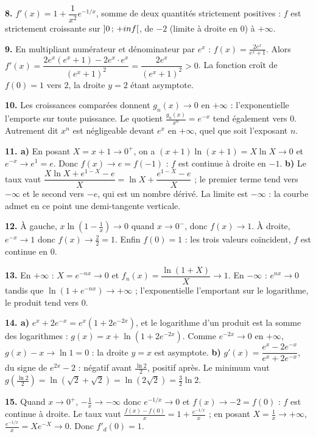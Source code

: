 \begin{corrige}[annales]
\textbf{8.} $f'(x) = 1+\dfrac{1}{x^{2}}e^{-1/x}$, somme de deux quantités
strictement positives : $f$ est strictement croissante sur
$\left]0\,;\,+inf\right[$, de $-2$ (limite à droite en $0$) à $+\infty$.

\textbf{9.} En multipliant numérateur et dénominateur par $e^{x}$ :
$f(x) = \frac{2e^{x}}{e^{x}+1}$. Alors
$f'(x) = \dfrac{2e^{x}\left(e^{x}+1\right)-2e^{x}\cdot e^{x}}{\left(e^{x}+1\right)^{2}}
= \dfrac{2e^{x}}{\left(e^{x}+1\right)^{2}}>0$. La fonction croît de
$f(0) = 1$ vers $2$, la droite $y = 2$ étant asymptote.

\textbf{10.} Les croissances comparées donnent $g_{n}(x)\to0$ en $+\infty$ :
l'exponentielle l'emporte sur toute puissance. Le quotient
$\frac{g_{n}(x)}{x^{n}} = e^{-x}$ tend également vers $0$. Autrement dit
$x^{n}$ est négligeable devant $e^{x}$ en $+\infty$, quel que soit l'exposant
$n$.

\textbf{11. a)} En posant $X = x+1 \to 0^{+}$, on a
$(x+1)\ln(x+1) = X\ln X \to 0$ et $e^{-x} \to e^{1} = e$. Donc
$f(x) \to e = f(-1)$ : $f$ est continue à droite en $-1$.
\textbf{b)} Le taux vaut
$\dfrac{X\ln X+e^{1-X}-e}{X} = \ln X+\dfrac{e^{1-X}-e}{X}$ ; le premier terme
tend vers $-\infty$ et le second vers $-e$, qui est un nombre dérivé. La
limite est $-\infty$ : la courbe admet en ce point une demi-tangente
verticale.

\textbf{12.} À gauche, $x\ln\!\left(1-\frac1x\right) \to 0$ quand
$x\to0^{-}$, donc $f(x)\to1$. À droite, $e^{-x}\to1$ donc
$f(x)\to\frac22 = 1$. Enfin $f(0) = 1$ : les trois valeurs coïncident, $f$ est
continue en $0$.

\textbf{13.} En $+\infty$ : $X = e^{-nx}\to0$ et
$f_{n}(x) = \dfrac{\ln(1+X)}{X}\to1$. En $-\infty$ : $e^{nx}\to0$ tandis que
$\ln\!\left(1+e^{-nx}\right)\to+\infty$ ; l'exponentielle l'emportant sur le
logarithme, le produit tend vers $0$.

\textbf{14. a)} $e^{x}+2e^{-x} = e^{x}\left(1+2e^{-2x}\right)$, et le
logarithme d'un produit est la somme des logarithmes :
$g(x) = x+\ln\!\left(1+2e^{-2x}\right)$. Comme $e^{-2x}\to0$ en $+\infty$,
$g(x)-x \to \ln 1 = 0$ : la droite $y = x$ est asymptote.
\textbf{b)} $g'(x) = \dfrac{e^{x}-2e^{-x}}{e^{x}+2e^{-x}}$, du signe de
$e^{2x}-2$ : négatif avant $\frac{\ln2}{2}$, positif après. Le minimum vaut
$g\!\left(\frac{\ln2}{2}\right) = \ln\!\left(\sqrt2+\sqrt2\right)
= \ln\!\left(2\sqrt2\right) = \frac32\ln2$.

\textbf{15.} Quand $x\to0^{+}$, $-\frac1x\to-\infty$ donc $e^{-1/x}\to0$ et
$f(x)\to-2 = f(0)$ : $f$ est continue à droite. Le taux vaut
$\frac{f(x)-f(0)}{x} = 1+\frac{e^{-1/x}}{x}$ ; en posant
$X = \frac1x\to+\infty$, $\frac{e^{-1/x}}{x} = Xe^{-X}\to0$. Donc
$f'_{d}(0) = 1$.


\end{corrige}

